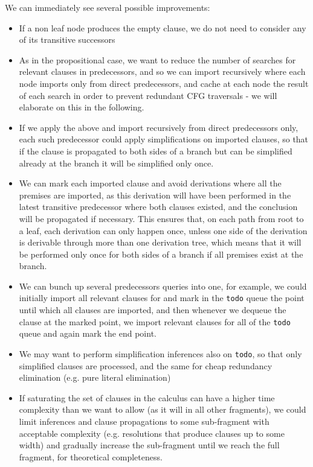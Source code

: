 We can immediately see several possible improvements:
\begin{itemize}
	\item If a non leaf node produces the empty clause, we do not need to consider any of its transitive successors
	\item As in the propositional case, we want to reduce the number of searches for relevant clauses in predecessors, and so we can import recursively where each node imports only from direct predecessors, and cache at each node the result of each search in order to prevent redundant CFG traversals - we will elaborate on this in the following.
	\item If we apply the above and import recursively from direct predecessors only, each such predecessor could apply simplifications on imported clauses, so that if the clause is propagated to both sides of a branch but can be simplified already at the branch it will be simplified only once.
	\item We can mark each imported clause and avoid derivations where all the premises are imported, 
	as this derivation will have been performed in the latest transitive predecessor where both clauses existed, and the conclusion will be propagated if necessary.
	This ensures that, on each path from root to a leaf, each derivation can only happen once, unless one side of the derivation is derivable through more than one derivation tree, which means that it will be performed only once for both sides of a branch if all premises exist at the branch.
	\item We can bunch up several predecessors queries into one, for example, we could initially import all relevant clauses for  and mark in the \lstinline{todo} queue the point until which all clauses are imported, and then whenever we dequeue the clause at the marked point, we import relevant clauses for all of the \lstinline{todo} queue and again mark the end point.
	\item We may want to perform simplification inferences also on \lstinline{todo}, so that only simplified clauses are processed, and the same for cheap redundancy elimination (e.g. pure literal elimination)
	\item If saturating the set of clauses in the calculus can have a higher time complexity than we want to allow (as it will in all other fragments), we could limit inferences and clause propagations to some sub-fragment with acceptable complexity (e.g. resolutions that produce clauses up to some width) and gradually increase the sub-fragment until we reach the full fragment, for theoretical completeness. 
\end{itemize}



